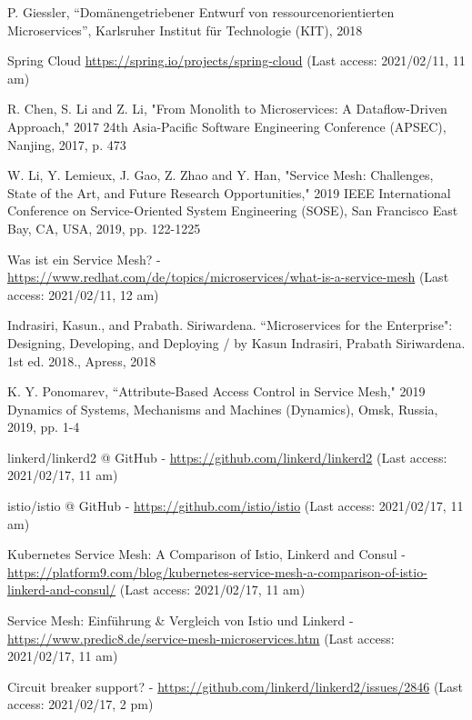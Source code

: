 \begin{thebibliography}{00}

 P. Giessler, ``Dom\"anengetriebener Entwurf von ressourcenorientierten Microservices'', Karlsruher Institut für Technologie (KIT), 2018

Spring Cloud \url{https://spring.io/projects/spring-cloud} (Last access: 2021/02/11, 11 am)

 R. Chen, S. Li and Z. Li, "From Monolith to Microservices: A Dataflow-Driven Approach," 2017 24th Asia-Pacific Software Engineering Conference (APSEC), Nanjing, 2017, p. 473

 W. Li, Y. Lemieux, J. Gao, Z. Zhao and Y. Han, "Service Mesh: Challenges, State of the Art, and Future Research Opportunities," 2019 IEEE International Conference on Service-Oriented System Engineering (SOSE), San Francisco East Bay, CA, USA, 2019, pp. 122-1225

 Was ist ein Service Mesh? - \url{https://www.redhat.com/de/topics/microservices/what-is-a-service-mesh} (Last access: 2021/02/11, 12 am)

 Indrasiri, Kasun., and Prabath. Siriwardena. ``Microservices for the Enterprise": Designing, Developing, and Deploying / by Kasun Indrasiri, Prabath Siriwardena. 1st ed. 2018., Apress, 2018

K. Y. Ponomarev, ``Attribute-Based Access Control in Service Mesh," 2019 Dynamics of Systems, Mechanisms and Machines (Dynamics), Omsk, Russia, 2019, pp. 1-4

 linkerd/linkerd2 @ GitHub - \url{https://github.com/linkerd/linkerd2} (Last access: 2021/02/17, 11 am)

 istio/istio @ GitHub - \url{https://github.com/istio/istio} (Last access: 2021/02/17, 11 am)

 Kubernetes Service Mesh: A Comparison of Istio, Linkerd and Consul - \url{https://platform9.com/blog/kubernetes-service-mesh-a-comparison-of-istio-linkerd-and-consul/} (Last access: 2021/02/17, 11 am)

 Service Mesh: Einführung \& Vergleich von Istio und Linkerd - \url{https://www.predic8.de/service-mesh-microservices.htm}  (Last access: 2021/02/17, 11 am)

 Circuit breaker support? - \url{https://github.com/linkerd/linkerd2/issues/2846} (Last access: 2021/02/17, 2 pm)
\end{thebibliography}